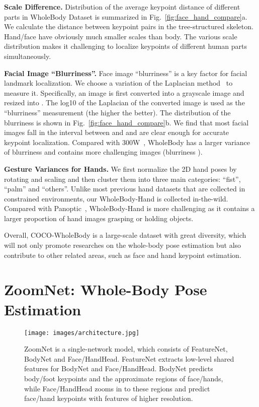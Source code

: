\documentclass[runningheads]{llncs}
\begin{document}
	\textbf{Scale Difference.}
	Distribution of the average keypoint distance of different parts in WholeBody Dataset is summarized in Fig.~\ref{fig:face_hand_compare}a. We calculate the distance between keypoint pairs in the tree-structured skeleton. Hand/face have obviously much smaller scales than body. The various scale distribution makes it challenging to localize keypoints of different human parts simultaneously. 
	
	
	\textbf{Facial Image ``Blurriness''.}
	Face image ``blurriness'' is a key factor for facial landmark localization. We choose a variation of the Laplacian method~\cite{Pech2000Diatom} to measure it. Specifically, an image is first converted into a grayscale image and resized into . The log10 of the Laplacian of the converted image is used as the ``blurriness'' measurement (the higher the better).  The distribution of the blurriness is shown in Fig.~\ref{fig:face_hand_compare}b. We find that most facial images fall in the interval between  and  and are clear enough for accurate keypoint localization. Compared with 300W~\cite{sagonas2013300}, WholeBody has a larger variance of blurriness and contains more challenging images (blurriness ).
	
	\textbf{Gesture Variances for Hands.}
	We first normalize the 2D hand poses by rotating and scaling and then cluster them into three main categories: ``fist'', ``palm'' and ``others''. Unlike most previous hand datasets that are collected in constrained environments, our WholeBody-Hand is collected in-the-wild. Compared with Panoptic~\cite{gomez2017large}, WholeBody-Hand is more challenging as it contains a larger proportion of hand images grasping or holding objects.
	
	Overall, COCO-WholeBody is a large-scale dataset with great diversity, which will not only promote researches on the whole-body pose estimation but also contribute to other related areas, such as face and hand keypoint estimation.
	
	\section{ZoomNet: Whole-Body Pose Estimation}
	
	\begin{figure*}[tb]
		\centering
		\texttt{[image: images/architecture.jpg]}
		\caption{ ZoomNet is a single-network model, which consists of FeatureNet, BodyNet and Face/HandHead. FeatureNet extracts low-level shared features for BodyNet and Face/HandHead. BodyNet predicts body/foot keypoints and the approximate regions of face/hands, while Face/HandHead zooms in to these regions and predict face/hand keypoints with features of higher resolution.
		}
		\label{fig:architecture}
	\end{figure*}
	
\end{document}
